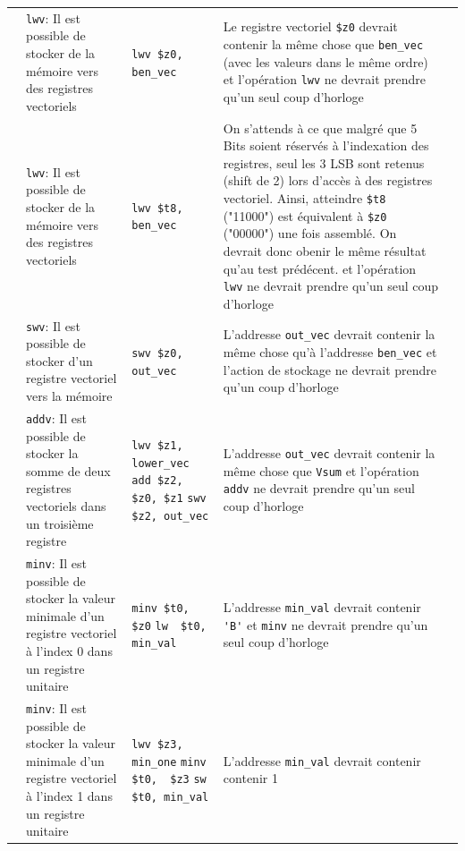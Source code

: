 \documentclass[a11paper]{article}
\newcommand{\cbox}{\fbox{\phantom{\ding{51}}}}
\newcounter{tid}
\newcommand{\tid}{\stepcounter{tid}\thetid}
\begin{document}
\begin{center}
\begin{longtable}{lp{5cm}p{3cm}p{5cm}l}
		\tid & \verb|lwv|:
		Il est possible de stocker de la mémoire vers des registres vectoriels &
		\verb|lwv $z0, ben_vec|                &
    Le registre vectoriel \verb|$z0| devrait contenir la même chose que
    \verb|ben_vec| (avec les valeurs dans le même ordre)
    et l'opération \verb|lwv| ne devrait prendre qu'un seul coup d'horloge &
		\cbox
		\\

		\tid & \verb|lwv|:
		Il est possible de stocker de la mémoire vers des registres vectoriels &
		\verb|lwv $t8, ben_vec|                &
    On s'attends à ce que malgré que 5 Bits soient réservés à l'indexation des
    registres, seul les 3 LSB sont retenus (shift de 2) lors d'accès à des
    registres vectoriel. Ainsi, atteindre \verb|$t8| ("11000") est équivalent
    à \verb|$z0| ("00000") une fois assemblé. On devrait donc obenir le même
    résultat qu'au test prédécent.
    et l'opération \verb|lwv| ne devrait prendre qu'un seul coup d'horloge &
		\cbox
		\\

		\tid & \verb|swv|:
		Il est possible de stocker d'un registre vectoriel vers la mémoire &
		\verb|swv $z0, out_vec|                &
    L'addresse \verb|out_vec| devrait contenir la même chose qu'à
    l'addresse \verb|ben_vec| et l'action de stockage ne devrait prendre qu'un
    coup d'horloge &
		\cbox
		\\

		\tid & \verb|addv|:
		Il est possible de stocker la somme de deux registres vectoriels dans un troisième
    registre &
		\verb|lwv $z1, lower_vec|
		\verb|add $z2, $z0, $z1|
		\verb|swv $z2, out_vec|
    &
    L'addresse \verb|out_vec| devrait contenir la même chose que \verb|Vsum|
    et l'opération \verb|addv| ne devrait prendre qu'un seul coup d'horloge &
		\cbox
		\\

		\tid & \verb|minv|:
		Il est possible de stocker la valeur minimale d'un registre vectoriel à l'index 0 dans
    un registre unitaire &
		\verb|minv $t0, $z0|
		\verb|lw  $t0, min_val|
    &
    L'addresse \verb|min_val| devrait contenir \verb|'B'|
    et \verb|minv| ne devrait prendre qu'un seul coup d'horloge &
		\cbox
		\\

		\tid & \verb|minv|:
		Il est possible de stocker la valeur minimale d'un registre vectoriel à l'index 1 dans
    un registre unitaire &
		\verb|lwv $z3, min_one|
		\verb|minv $t0,  $z3|
		\verb|sw  $t0, min_val|
    &
    L'addresse \verb|min_val| devrait contenir  contenir 1
    &
		\cbox
		\\


\end{longtable}
\end{center}
\end{document}
